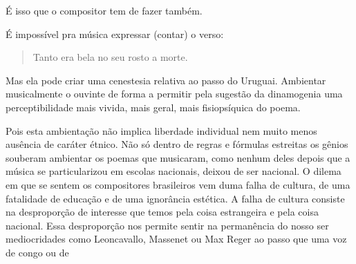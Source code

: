É isso que o compositor tem de fazer também.

É impossível pra música expressar (contar) o verso:

\begin{verse}
\small{Tanto era bela no seu rosto a morte.}
\end{verse}

Mas ela pode criar uma cenestesia relativa ao passo do Uruguai.
Ambientar musicalmente o ouvinte de forma a permitir pela sugestão da
dinamogenia uma perceptibilidade mais vivida, mais geral, mais
fisiopsíquica do poema.

Pois esta ambientação não implica liberdade individual nem muito menos
ausência de caráter étnico. Não só dentro de regras e fórmulas estreitas
os gênios souberam ambientar os poemas que musicaram, como nenhum deles
depois que a música se particularizou em escolas nacionais, deixou de
ser nacional. O dilema em que se sentem os compositores brasileiros vem
duma falha de cultura, de uma fatalidade de educação e de uma ignorância
estética. A falha de cultura consiste na desproporção de interesse que
temos pela coisa estrangeira e pela coisa nacional. Essa desproporção
nos permite sentir na permanência do nosso ser mediocridades como
Leoncavallo, Massenet ou Max Reger ao passo que uma voz de congo ou de
